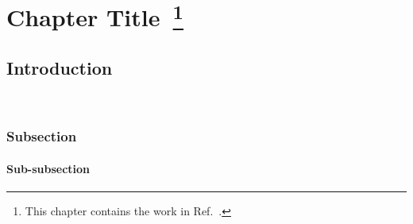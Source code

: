 \chapter[Chapter Title]
{Chapter Title~\footnote{This chapter contains the work in Ref.~\cite{abc1}.}}
\label{chap:4}

\section{Introduction}
\lipsum[2-4]  ~\cite{abc1}
\subsection{Subsection}
\lipsum[2-4]
\subsubsection{Sub-subsection}
\lipsum[2-4]